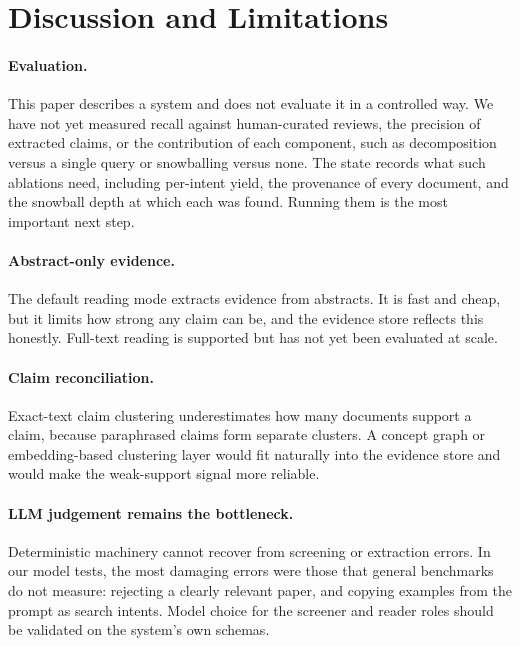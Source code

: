 \documentclass{article}
\begin{document}
\section{Discussion and Limitations}
\label{sec:discussion}

\paragraph{Evaluation.} This paper describes a system and does not
evaluate it in a controlled way. We have not yet measured recall against
human-curated reviews, the precision of extracted claims, or the
contribution of each component, such as decomposition versus a single
query or snowballing versus none. The state records what such ablations
need, including per-intent yield, the provenance of every document, and
the snowball depth at which each was found. Running them is the most
important next step.

\paragraph{Abstract-only evidence.} The default reading mode extracts
evidence from abstracts. It is fast and cheap, but it limits how strong any
claim can be, and the evidence store reflects this honestly. Full-text
reading is supported but has not yet been evaluated at scale.

\paragraph{Claim reconciliation.} Exact-text claim clustering
underestimates how many documents support a claim, because paraphrased
claims form separate clusters. A concept graph or embedding-based
clustering layer would fit naturally into the evidence store and would
make the weak-support signal more reliable.

\paragraph{LLM judgement remains the bottleneck.} Deterministic machinery
cannot recover from screening or extraction errors. In our model tests,
the most damaging errors were those that general benchmarks do not
measure: rejecting a clearly relevant paper, and copying examples from the
prompt as search intents. Model choice for the screener and reader roles
should be validated on the system's own schemas.
\end{document}
